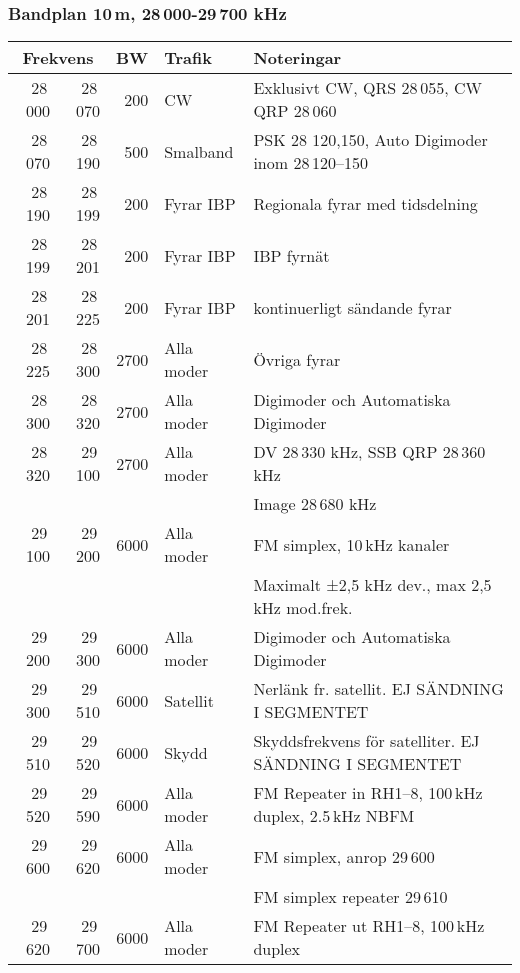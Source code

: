 \small
\subsubsection{Bandplan 10\,m, 28\,000-29\,700 kHz}
\begin{tabular}{rrrll}
\multicolumn{2}{c}{\textbf{Frekvens}} & \textbf{BW} & \textbf{Trafik} & \textbf{Noteringar} \\ \hline
28\,000 & 28\,070 & 200  & CW         & Exklusivt CW, QRS 28\,055, CW QRP 28\,060              \\ \hline
28\,070 & 28\,190 & 500  & Smalband   & PSK 28 120,150, Auto Digimoder inom 28\,120--150       \\ \hline
28\,190 & 28\,199 & 200  & Fyrar IBP  & Regionala fyrar med tidsdelning                        \\ \hline
28\,199 & 28\,201 & 200  & Fyrar IBP  & IBP fyrnät                                             \\ \hline
28\,201 & 28\,225 & 200  & Fyrar IBP  & kontinuerligt sändande fyrar                           \\ \hline
28\,225 & 28\,300 & 2700 & Alla moder & Övriga fyrar                                           \\ \hline
28\,300 & 28\,320 & 2700 & Alla moder & Digimoder och Automatiska Digimoder                    \\ \hline
28\,320 & 29\,100 & 2700 & Alla moder & DV 28\,330 kHz, SSB QRP 28\,360 kHz                    \\
        &         &      &            & Image 28\,680 kHz                                      \\ \hline
29\,100 & 29\,200 & 6000 & Alla moder & FM simplex, 10\,kHz kanaler                            \\
        &         &      &            & Maximalt ±2,5 kHz dev., max 2,5\,kHz mod.frek.         \\ \hline
29\,200 & 29\,300 & 6000 & Alla moder & Digimoder och Automatiska Digimoder                    \\ \hline
29\,300 & 29\,510 & 6000 & Satellit   & Nerlänk fr. satellit. EJ SÄNDNING I SEGMENTET          \\ \hline
29\,510 & 29\,520 & 6000 & Skydd      & Skyddsfrekvens för satelliter. EJ SÄNDNING I SEGMENTET \\ \hline
29\,520 & 29\,590 & 6000 & Alla moder & FM Repeater in RH1--8, 100\,kHz duplex, 2.5\,kHz NBFM  \\ \hline
29\,600 & 29\,620 & 6000 & Alla moder & FM simplex, anrop 29\,600                              \\
        &         &      &            & FM simplex repeater 29\,610                            \\ \hline
29\,620 & 29\,700 & 6000 & Alla moder & FM Repeater ut RH1--8, 100\,kHz duplex                 \\ \hline
\end{tabular}
\normalsize


